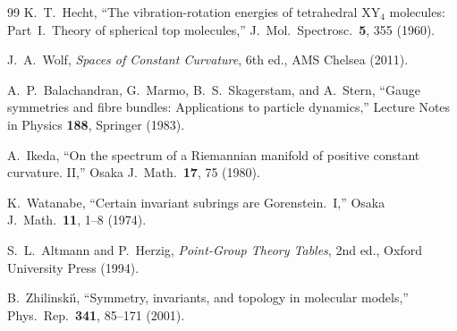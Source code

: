 \documentclass[12pt]{article}
\theoremstyle{definition}
\theoremstyle{remark}
\begin{document}
\begin{thebibliography}{99}
  K.~T.~Hecht,
  ``The vibration-rotation energies of tetrahedral
  XY$_4$ molecules: Part~I.\ Theory of spherical
  top molecules,''
  J.\ Mol.\ Spectrosc.\ \textbf{5}, 355 (1960).

  J.~A.~Wolf,
  \emph{Spaces of Constant Curvature},
  6th ed., AMS Chelsea (2011).

  A.~P.~Balachandran, G.~Marmo, B.~S.~Skagerstam,
  and A.~Stern,
  ``Gauge symmetries and fibre bundles:
  Applications to particle dynamics,''
  Lecture Notes in Physics \textbf{188},
  Springer (1983).

  A.~Ikeda,
  ``On the spectrum of a Riemannian manifold of positive
  constant curvature. II,''
  Osaka J.\ Math.\ \textbf{17}, 75 (1980).

  K.~Watanabe,
  ``Certain invariant subrings are Gorenstein.\ I,''
  Osaka J.\ Math.\ \textbf{11}, 1--8 (1974).

  S.~L.~Altmann and P.~Herzig,
  \emph{Point-Group Theory Tables},
  2nd ed., Oxford University Press (1994).

  B.~Zhilinski\'{\i},
  ``Symmetry, invariants, and topology in molecular
  models,''
  Phys.\ Rep.\ \textbf{341}, 85--171 (2001).

\end{thebibliography}
\end{document}
